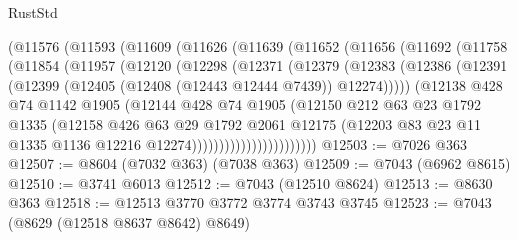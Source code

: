 \begin{lexlean}{RustStd}
\begin{coremodule}
          (@11576
            (@11593
              (@11609
                (@11626
                  (@11639
                    (@11652
                      (@11656
                        (@11692
                          (@11758
                            (@11854
                              (@11957
                                (@12120
                                  (@12298
                                    (@12371
                                      (@12379
                                        (@12383
                                          (@12386
                                            (@12391
                                              (@12399
                                                (@12405 (@12408 (@12443 @12444 @7439)) @12274)))))
                                        (@12138
                                          @428
                                          @74
                                          @1142
                                          @1905
                                          (@12144
                                            @428
                                            @74
                                            @1905
                                            (@12150
                                              @212
                                              @63
                                              @23
                                              @1792
                                              @1335
                                              (@12158
                                                @426
                                                @63
                                                @29
                                                @1792
                                                @2061
                                                @12175
                                                (@12203
                                                  @83
                                                  @23
                                                  @11
                                                  @1335
                                                  @1136
                                                  @12216
                                                  @12274)))))))))))))))))))))))
@12503 := @7026 @363
@12507 := @8604 (@7032 @363) (@7038 @363)
@12509 := @7043 (@6962 @8615)
@12510 := @3741 @6013
@12512 := @7043 (@12510 @8624)
@12513 := @8630 @363
@12518 := @12513 @3770 @3772 @3774 @3743 @3745
@12523 := @7043 (@8629 (@12518 @8637 @8642) @8649)

\end{coremodule}
\end{lexlean}
